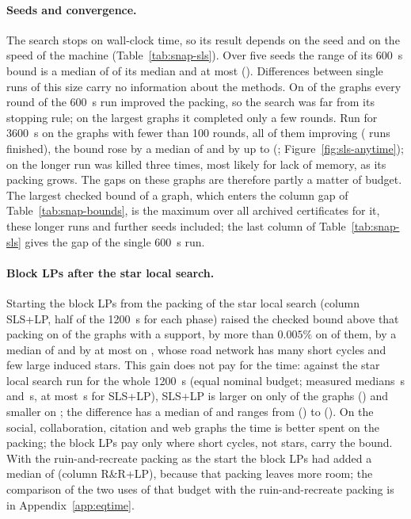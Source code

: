 \paragraph{Seeds and convergence.}  The search stops on wall-clock time, so
its result depends on the seed and on the speed of the machine
(Table~\ref{tab:snap-sls}).  Over five seeds the range of its \SI{600}{s}
bound is a median of \numSlsSeedSpreadMedian{} of its median and at most
\numSlsSeedSpreadMax{} (\numSlsSeedSpreadMaxGraph{}).  Differences between
single runs of this size carry no information about the methods.  On
\numSlsNotConv{} of the \numSlsGraphsN{} graphs every round of the
\SI{600}{s} run improved the packing, so the search was far from its
stopping rule; on the largest graphs it completed only a few rounds.  Run for
\SI{3600}{s} on the graphs with fewer than 100 rounds, all of them
improving (\numSlsLongN{} runs finished), the bound rose by a median of \numSlsLongGainMedian{} and by
up to \numSlsLongGainMax{} (\numSlsLongGainMaxGraph{};
Figure~\ref{fig:sls-anytime}); on \numSlsLongFailList{} the longer run was
killed three times, most likely for lack of memory, as its packing grows.  The gaps on these graphs are therefore partly
a matter of budget.  The largest checked bound of a graph, which enters the
column gap of Table~\ref{tab:snap-bounds}, is the maximum over all archived
certificates for it, these longer runs and further seeds included; the last
column of Table~\ref{tab:snap-sls} gives the gap of the single \SI{600}{s}
run.

\paragraph{Block LPs after the star local search.}  Starting the block LPs
from the packing of the star local search (column SLS+LP, half of the
\SI{1200}{s} for each phase) raised the checked bound above that packing on
\numSlpGainPosAny{} of the \numSlpN{} graphs with a support, by more than
$0.005\%$ on \numSlpGainPos{} of them, by a median of \numSlpGainMedian{} and
by at most \numSlpGainMax{} on \numSlpGainMaxGraph{}, whose road network has
many short cycles and few large induced stars.  This gain does not pay
for the time: against the star local search run for the whole \SI{1200}{s}
(equal nominal budget; measured medians \numEqLpTimeSls{}\,s and
\numEqLpTimeSlp{}\,s, at most \numEqLpTimeSlpMax{}\,s for SLS+LP),
SLS+LP is larger on only \numEqLpWins{} of the \numEqLpN{} graphs
(\numEqLpWinList{}) and smaller on \numEqLpLoses{}; the difference has a
median of \numEqLpMedian{} and ranges from \numEqLpMin{}
(\numEqLpMinGraph{}) to \numEqLpMax{} (\numEqLpMaxGraph{}).  On the social,
collaboration, citation and web graphs the time is better spent on the
packing; the block LPs pay only where short cycles, not stars, carry the
bound.  With the
ruin-and-recreate packing as the start the block LPs had added a median of
\numPlpGainMedian{} (column R\&R+LP), because that packing leaves more room;
the comparison of the two uses of that budget with the ruin-and-recreate
packing is in Appendix~\ref{app:eqtime}.


